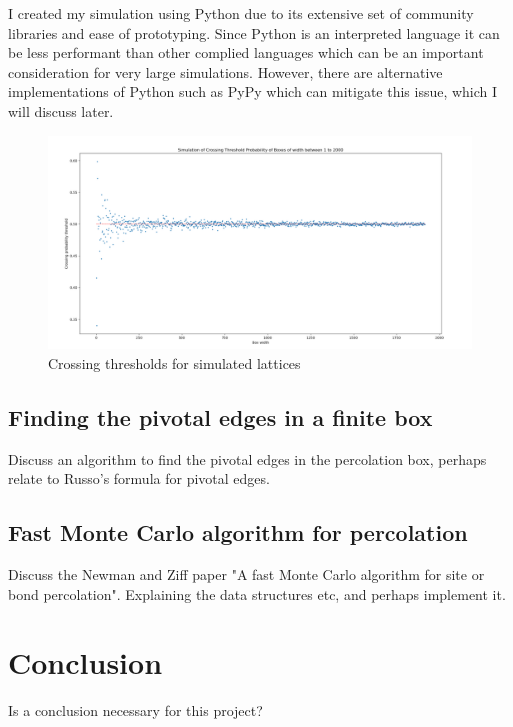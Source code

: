 \documentclass[a4paper,11pt]{article}
\theoremstyle{definition}
\begin{document}
I created my simulation using Python due to its extensive set of community libraries and ease of prototyping. Since Python is an interpreted language it can be less performant than other complied languages which can be an important consideration for very large simulations. However, there are alternative implementations of Python such as PyPy which can mitigate this issue, which I will discuss later.



\begin{landscape}
\begin{figure}
	\centering
	\includegraphics[scale=0.52]{CrossingSimulationPlot3.png}
	\caption{Crossing thresholds for simulated lattices}
	\label{fig:thresholdplot2}
\end{figure}
\end{landscape}
\subsection{Finding the pivotal edges in a finite box}
Discuss an algorithm to find the pivotal edges in the percolation box, perhaps relate to Russo's formula for pivotal edges.
\subsection{Fast Monte Carlo algorithm for percolation}
Discuss the Newman and Ziff paper "A fast Monte Carlo algorithm for site or bond percolation". Explaining the data structures etc, and perhaps implement it.

\section{Conclusion}
Is a conclusion necessary for this project?
\end{document}
